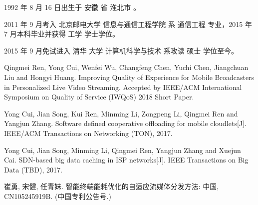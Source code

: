 \begin{resume}


  1992 年 8 月 16 日出生于 安徽 省 淮北市 。

  2011 年 9 月考入 北京邮电大学 信息与通信工程学院 系 通信工程 专业，2015 年 7 月本科毕业并获得 工学 学士学位。

  2015 年 9 月免试进入 清华 大学 计算机科学与技术 系攻读 硕士 学位至今。


%

  \begin{publications}
    \item Qingmei Ren, Yong Cui, Wenfei Wu, Changfeng Chen, Yuchi Chen, Jiangchuan Liu and Hongyi Huang. Improving Quality of Experience for Mobile Broadcasters in Personalized Live Video Streaming. Accepted by IEEE/ACM International Symposium on Quality of Service (IWQoS) 2018 Short Paper.
    \item Yong Cui, Jian Song, Kui Ren, Minming Li, Zongpeng Li, Qingmei Ren and Yangjun Zhang. Software defined cooperative offloading for mobile cloudlets[J]. IEEE/ACM Transactions on Networking (TON), 2017.
    \item Yong Cui, Jian Song, Minming Li, Qingmei Ren, Yangjun Zhang and Xuejun Cai. SDN-based big data caching in ISP networks[J]. IEEE Transactions on Big Data (TBD), 2017.
  \end{publications}

  \begin{achievements}
    \item 崔勇, 宋健, 任青妹. 智能终端能耗优化的自适应流媒体分发方法: 中国, CN105245919B. (中国专利公告号.)
  \end{achievements}

\end{resume}
